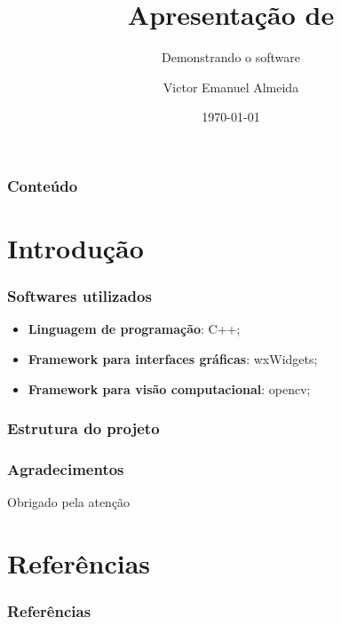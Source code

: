\documentclass[12pt]{beamer}
\author[Aluno:~Victor E. Almeida]{Victor Emanuel Almeida}
\title{Apresentação de \materia}
\subtitle{Demonstrando o software}
\date{\today}
\institute{UNIOESTE}
\begin{document}
\frame{\titlepage}

\begin{frame}
\frametitle{Conteúdo}
\tableofcontents
\end{frame}

\section{Introdução}\label{Introdução}
\begin{frame}
    \frametitle{Softwares utilizados}
    \begin{itemize}
    \item\textbf{Linguagem de programação}: C++;
    \item\textbf{Framework para interfaces gráficas}: wxWidgets\cite{docsWx};
    \item\textbf{Framework para visão computacional}: opencv;
    \end{itemize}
\end{frame}

\begin{frame}
    \frametitle{Estrutura do projeto}
\end{frame}

\begin{frame}
    \frametitle{Agradecimentos}
    \centering
    \Huge{Obrigado pela atenção}
\end{frame}

\section{Referências}\label{Referências}
\begin{frame}[allowframebreaks]
    \frametitle{Referências} 
    
\end{frame}
\end{document}
